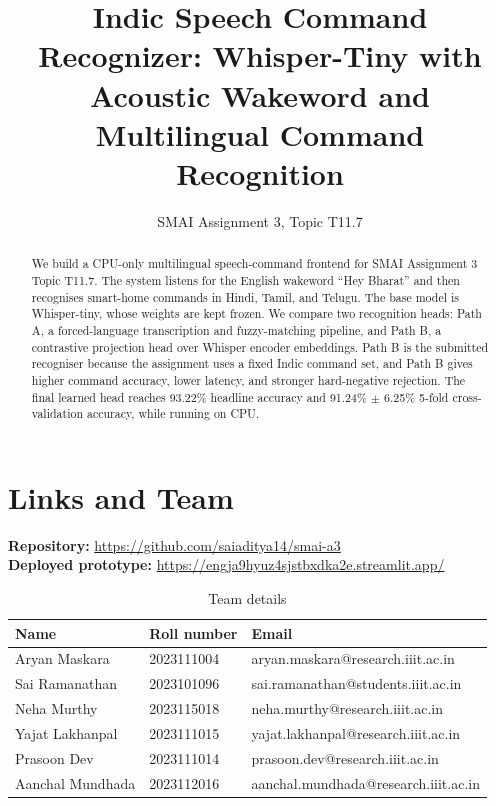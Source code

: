 \documentclass[11pt]{article}
\title{Indic Speech Command Recognizer: Whisper-Tiny with Acoustic Wakeword and Multilingual Command Recognition}
\author{SMAI Assignment 3, Topic T11.7}
\date{}
\begin{document}
\maketitle

\begin{abstract}
We build a CPU-only multilingual speech-command frontend for SMAI Assignment 3
Topic T11.7. The system listens for the English wakeword ``Hey Bharat'' and
then recognises smart-home commands in Hindi, Tamil, and Telugu. The base
model is Whisper-tiny, whose weights are kept frozen. We compare two
recognition heads: Path A, a forced-language transcription and fuzzy-matching
pipeline, and Path B, a contrastive projection head over Whisper encoder
embeddings. Path B is the submitted recogniser because the assignment uses a
fixed Indic command set, and Path B gives higher command accuracy, lower
latency, and stronger hard-negative rejection. The final learned head reaches
93.22\% headline accuracy and 91.24\% $\pm$ 6.25\% 5-fold cross-validation
accuracy, while running on CPU.
\end{abstract}

\section{Links and Team}

\textbf{Repository:} \url{https://github.com/saiaditya14/smai-a3}\\
\textbf{Deployed prototype:} \url{https://engja9hyuz4sjstbxdka2e.streamlit.app/}

\begin{table}[h]
\centering
\caption{Team details}
\small
\begin{tabular}{lll}
\toprule
Name & Roll number & Email \\
\midrule
Aryan Maskara & 2023111004 & aryan.maskara@research.iiit.ac.in \\
Sai Ramanathan & 2023101096 & sai.ramanathan@students.iiit.ac.in \\
Neha Murthy & 2023115018 & neha.murthy@research.iiit.ac.in \\
Yajat Lakhanpal & 2023111015 & yajat.lakhanpal@research.iiit.ac.in \\
Prasoon Dev & 2023111014 & prasoon.dev@research.iiit.ac.in \\
Aanchal Mundhada & 2023112016 & aanchal.mundhada@research.iiit.ac.in \\
\bottomrule
\end{tabular}
\end{table}
\end{document}
